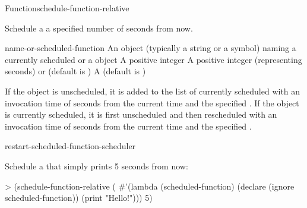 \documentclass[10pt,twoside,english,pdftex]{article}
\begin{document}
\begin{functiondoc}{Function}{schedule-function-relative}%
  { 
     }
%
%
%

\fnsyntax

\fnpurpose Schedule a  a specified number of
seconds from now.

\fnpackage {}

\fnmodule {}

\fnargs
\begin{args}{name-or-scheduled-function}
 An object (typically a string or a
  symbol) naming a currently scheduled  or a
   object
\arg[seconds] A positive integer
 A positive integer (representing seconds) or
  \nil{} (default is \nil)
\arg[verbose] A 
  (default is \textbf{})
\end{args}

\fnerrors
\nothreads{}

\fndescription If the  object is unscheduled, it is
added to the list of currently scheduled  with an
invocation time of  seconds from the current time and the
specified .  If the  object is
currently scheduled, it is first unscheduled and then rescheduled with an
invocation time of  seconds from the current time and the
specified .

\begin{alsos}{restart-scheduled-function-scheduler}
\end{alsos}

%
\fnexamples
Schedule a  that simply prints  
5 seconds from now:
\begin{example}
> (schedule-function-relative
    (
      #'(lambda (scheduled-function)
          (declare (ignore scheduled-function))
          (print "Hello!")))
     5)
\end{example}


\end{functiondoc}
\end{document}
